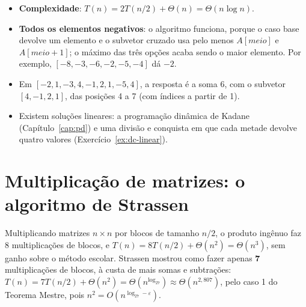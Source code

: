 \begin{itemize}
  \item \textbf{Complexidade}: $T(n)=2T(n/2)+\Theta(n)=\Theta(n\log n)$.
  \item \textbf{Todos os elementos negativos}: o algoritmo funciona, porque o caso base devolve um elemento e o subvetor cruzado usa pelo menos $A[meio]$ e $A[meio+1]$; o máximo das três opções acaba sendo o maior elemento. Por exemplo, $[-8,-3,-6,-2,-5,-4]$ dá $-2$.
  \item Em $[-2,1,-3,4,-1,2,1,-5,4]$, a resposta é a soma $6$, com o subvetor $[4,-1,2,1]$, das posições 4 a 7 (com índices a partir de 1).
  \item Existem soluções lineares: a programação dinâmica de Kadane (Capítulo~\ref{cap:pd}) e uma divisão e conquista em que cada metade devolve quatro valores (Exercício~\ref{ex:dc-linear}).
\end{itemize}

\section{Multiplicação de matrizes: o algoritmo de Strassen}\label{sec:strassen}
Multiplicando matrizes $n\times n$ por blocos de tamanho $n/2$, o produto ingênuo faz 8 multiplicações de blocos, e $T(n)=8T(n/2)+\Theta(n^2)=\Theta(n^3)$, sem ganho sobre o método escolar. Strassen mostrou como fazer apenas \textbf{7} multiplicações de blocos, à custa de mais somas e subtrações: $T(n)=7T(n/2)+\Theta(n^2)=\Theta(n^{\log_27})\approx\Theta(n^{2{,}807})$, pelo caso 1 do Teorema Mestre, pois $n^2=O(n^{\log_27-\varepsilon})$.

\begin{figura}
\end{figura}

